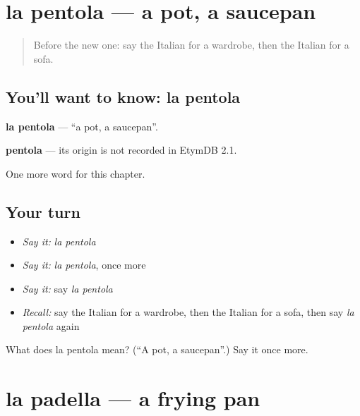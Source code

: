 \section[la pentola]{la pentola — a pot, a saucepan}

\label{lesson:IT-C98-pentola}



\begin{quote}
Before the new one: say the Italian for a wardrobe, then the Italian for a sofa.
\end{quote}

\subsection*{You'll want to know: la pentola}
\textbf{la pentola} — \textquotedblleft{}a pot, a saucepan\textquotedblright{}.

\begin{cousinweb}
\textbf{pentola} — its origin is not recorded in EtymDB 2.1.
\end{cousinweb}

\begin{grammarlens}[title={What you've built}]
One more word for this chapter.
\end{grammarlens}

\subsection*{Your turn}
\begin{itemize}
\raggedright
  \item \emph{Say it:} \emph{la pentola}
  \item \emph{Say it:} \emph{la pentola}, once more
  \item \emph{Say it:} say \emph{la pentola}
  \item \emph{Recall:} say the Italian for a wardrobe, then the Italian for a sofa, then say \emph{la pentola} again
\end{itemize}

\begin{tcolorbox}[breakable,colback=teal!4,colframe=teal!35!black,title={Before you move on}]
What does la pentola mean? (\textquotedblleft{}A pot, a saucepan\textquotedblright{}.) Say it once more.
\end{tcolorbox}
\section[la padella]{la padella — a frying pan}

